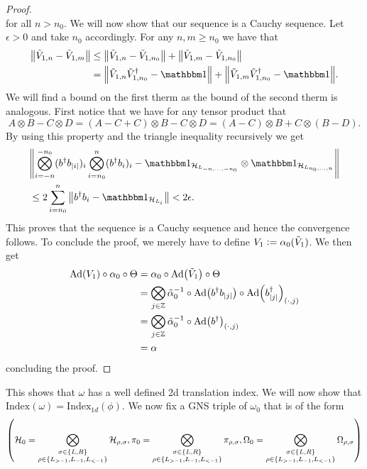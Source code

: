\documentclass[12pt,a4paper,twoside]{article}
\numberwithin{equation}{section}
\begin{document}
\begin{proof}
\begin{equation}
	\end{equation}
	for all $n>n_0$. We will now show that our sequence is a Cauchy sequence. Let $\epsilon>0$ and take $n_0$ accordingly. For any $n,m\geq n_0$ we have that
	\begin{align}
		\norm{\tilde{V}_{1,n}-\tilde{V}_{1,m}}&\leq \norm{\tilde{V}_{1,n}-\tilde{V}_{1,n_0}}+\norm{\tilde{V}_{1,m}-\tilde{V}_{1,n_0}}\\
		&=\norm{\tilde{V}_{1,n}\tilde{V}_{1,n_0}^\dagger-\id}+\norm{\tilde{V}_{1,m}\tilde{V}_{1,n_0}^\dagger-\id}.
	\end{align}
	We will find a bound on the first therm as the bound of the second therm is analogous. First notice that we have for any tensor product that
	\begin{equation}
		A\otimes B-C\otimes D=(A-C+C)\otimes B-C\otimes D=(A-C)\otimes B+C\otimes (B-D).
	\end{equation}
	By using this property and the triangle inequality recursively we get
	\begin{align}
	&\norm{\bigotimes_{i=-n}^{-n_0}(b^\dagger b_\abs{i})_i\bigotimes_{i=n_0}^{n}(b^\dagger b_i)_i-\id_{\HH_{L_{-n,\ldots,-n_0}}}\otimes\id_{\HH_{L_{n_0,\ldots,n}}}}\\
	&\leq 2\sum_{i=n_0}^{n}\norm{b^\dagger b_i-\id_{\HH_{L_i}}}<2\epsilon.
	\end{align}
	This proves that the sequence is a Cauchy sequence and hence the convergence follows. To conclude the proof, we merely have to define $V_1\vcentcolon= \alpha_0(\tilde{V}_1)$. We then get
	\begin{align}
		\Ad{V_1}\circ \alpha_0\circ \Theta&= \alpha_0\circ\Ad{\tilde V_1}\circ \Theta\\
		&=\bigotimes_{j\in\ZZ}\tilde\alpha_0^{-1}\circ\Ad{b^\dagger b_\abs{j}}\circ \Ad{b_\abs{j}^\dagger}_{(\cdot,j)}\\
		&=\bigotimes_{j\in\ZZ}\tilde\alpha_0^{-1}\circ\Ad{b^\dagger}_{(\cdot,j)}\\
		&=\alpha
	\end{align}
	concluding the proof.
\end{proof}
This shows that $\omega$ has a well defined 2d translation index. We will now show that $\textrm{Index}(\omega)=\textrm{Index}_{1d}(\phi)$. We now fix a GNS triple of $\omega_0$ that is of the form
\begin{equation}
	\left(\HH_0=\bigotimes_{\substack{\sigma\in\{L,R\}\\ \rho\in\{L_{>-1},L_{-1},L_{<-1}\}}}\HH_{\rho,\sigma},\pi_0=\bigotimes_{\substack{\sigma\in\{L,R\}\\ \rho\in\{L_{>-1},L_{-1},L_{<-1}\}}}\pi_{\rho,\sigma},\Omega_0=\bigotimes_{\substack{\sigma\in\{L,R\}\\ \rho\in\{L_{>-1},L_{-1},L_{<-1}\}}}\Omega_{\rho,\sigma}\right)
\end{equation}
\end{document}
